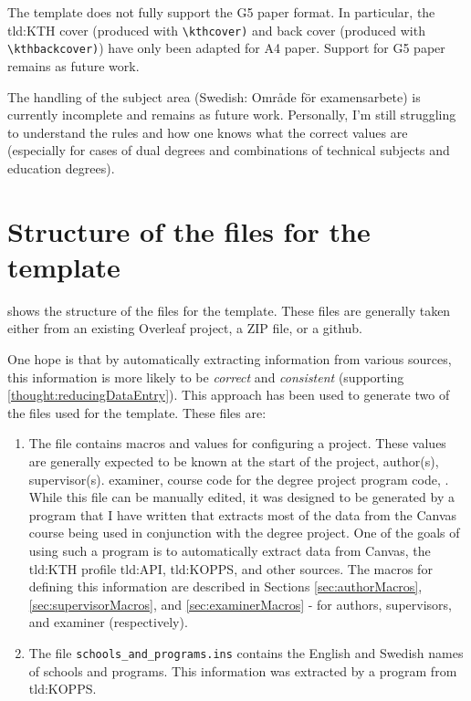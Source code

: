 The template does not fully support the G5 paper format. In particular, the \gls{tld:KTH} cover (produced with \texttt{\textbackslash kthcover)} and back cover (produced with \texttt{\textbackslash kthbackcover)}) have only been adapted for A4 paper. Support for G5 paper remains as future work.

The handling of the subject area (Swedish: \foreignlanguage{swedish}{Område för examensarbete}) is currently incomplete and remains as future work. Personally, I'm still struggling to understand the rules and how one knows what the correct values are (especially for cases of \first dual degrees and \Second combinations of technical subjects and education degrees).

\section{Structure of the files for the template}
 shows the structure of the files for the template. These files are generally taken either from an existing Overleaf project, a ZIP file, or a github.

One hope is that by automatically extracting information from various sources, this information is more likely to be \textit{correct} and \textit{consistent} (supporting \ref{thought:reducingDataEntry}). This approach has been used to generate two of the files used for the template. These files are:
\begin{enumerate}
    \item The file  contains macros and values for configuring a project. These values are generally expected to be known at the start of the project, \eg author(s), supervisor(s). examiner, course code for the degree project program code, \etc. While this file can be manually edited, it was designed to be generated by a program that I have written that extracts most of the data from the Canvas course being used in conjunction with the degree project. One of the goals of using such a program is to automatically extract data from Canvas, the \gls{tld:KTH} profile \gls{tld:API}, \gls{tld:KOPPS}, and other sources. The macros for defining this information are described in Sections \ref{sec:authorMacros}, \ref{sec:supervisorMacros}, and \ref{sec:examinerMacros} - for authors, supervisors, and examiner (respectively).

    \item The file \texttt{schools\_and\_programs.ins} contains the English and Swedish names of schools and programs. This information was extracted by a program from \gls{tld:KOPPS}.
\end{enumerate}

